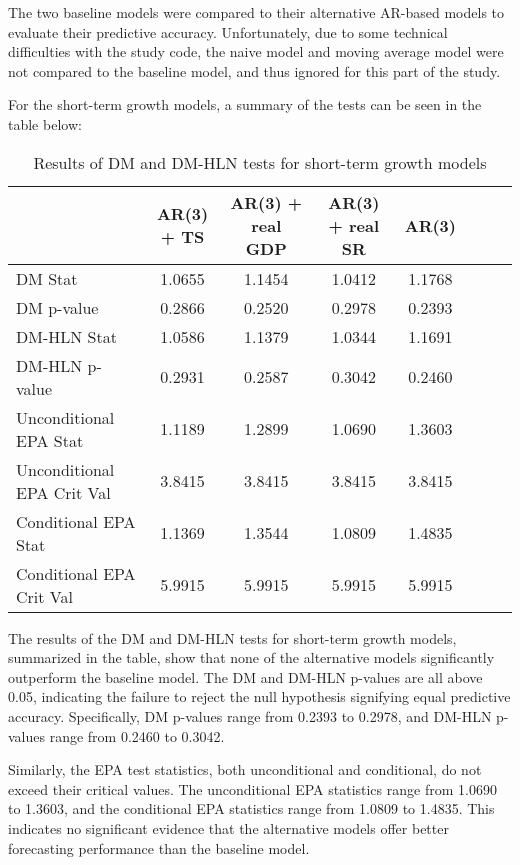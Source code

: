 \documentclass[12pt]{article}
\begin{document}
The two baseline models were compared to their alternative AR-based models to evaluate their predictive accuracy. Unfortunately, due to some technical difficulties with the study code, the naive model and moving average model were not compared to the baseline model, and thus ignored for this part of the study.

For the short-term growth models, a summary of the tests can be seen in the table below:

\begin{table}[H]
\centering
\begin{tabular}{lccccccc}
\hline
 & AR(3) + TS & AR(3) + real GDP & AR(3) + real SR & AR(3) \\
\hline
DM Stat & 1.0655 & 1.1454 & 1.0412 & 1.1768 \\
DM p-value & 0.2866 & 0.2520 & 0.2978 & 0.2393 \\
DM-HLN Stat & 1.0586 & 1.1379 & 1.0344 & 1.1691 \\
DM-HLN p-value & 0.2931 & 0.2587 & 0.3042 & 0.2460 \\
Unconditional EPA Stat & 1.1189 & 1.2899 & 1.0690 & 1.3603 \\
Unconditional EPA Crit Val & 3.8415 & 3.8415 & 3.8415 & 3.8415 \\
Conditional EPA Stat & 1.1369 & 1.3544 & 1.0809 & 1.4835 \\
Conditional EPA Crit Val & 5.9915 & 5.9915 & 5.9915 & 5.9915 \\
\hline
\end{tabular}
\caption{Results of DM and DM-HLN tests for short-term growth models}
\label{tab:dm_test_short_term_transposed}
\end{table}



The results of the DM and DM-HLN tests for short-term growth models, summarized in the table, show that none of the alternative models significantly outperform the baseline model. The DM and DM-HLN p-values are all above 0.05, indicating the failure to reject the null hypothesis signifying equal predictive accuracy. Specifically, DM p-values range from 0.2393 to 0.2978, and DM-HLN p-values range from 0.2460 to 0.3042.

Similarly, the EPA test statistics, both unconditional and conditional, do not exceed their critical values. The unconditional EPA statistics range from 1.0690 to 1.3603, and the conditional EPA statistics range from 1.0809 to 1.4835. This indicates no significant evidence that the alternative models offer better forecasting performance than the baseline model.
\end{document}
